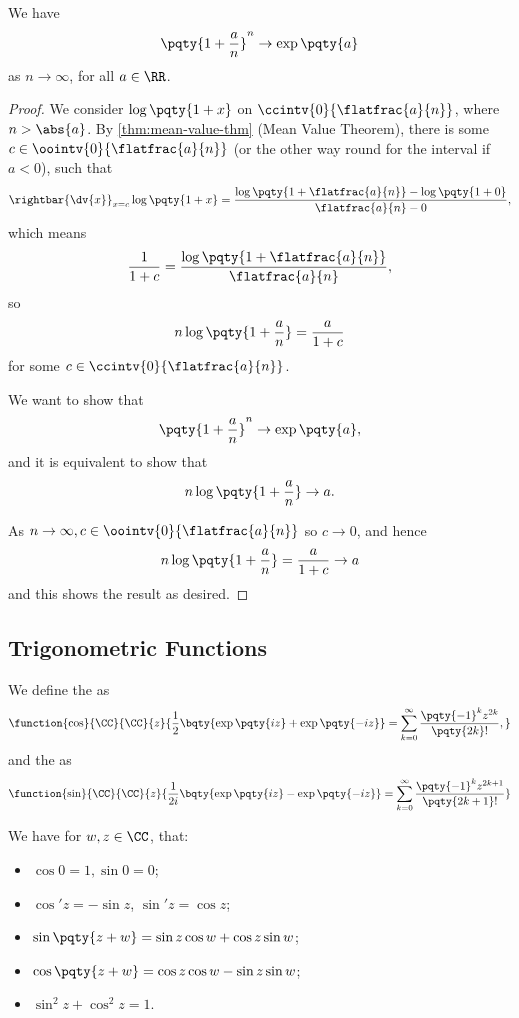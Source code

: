\begin{proposition}
    We have
    \[
        \pqty{1 + \frac{a}{n}}^n \to \exp \pqty{a}
    \]
    as \(n \to \infty\), for all \(a \in \RR\).
\end{proposition}

\begin{proof}
    We consider \(\log\pqty{1 + x}\) on \(\ccintv{0}{\flatfrac{a}{n}}\), where \(n > \abs{a}\). By \autoref{thm:mean-value-thm} (Mean Value Theorem), there is some \(c \in \oointv{0}{\flatfrac{a}{n}}\) (or the other way round for the interval if \(a < 0\)), such that
    \[
        \rightbar{\dv{x}}_{x = c} \log \pqty{1 + x} = \frac{\log\pqty{1 + \flatfrac{a}{n}} - \log\pqty{1 + 0}}{\flatfrac{a}{n} - 0},
    \]
    which means
    \[
        \frac{1}{1 + c} = \frac{\log \pqty{1 + \flatfrac{a}{n}}}{\flatfrac{a}{n}},
    \]
    so
    \[
        n \log \pqty{1 + \frac{a}{n}} = \frac{a}{1 + c}
    \]
    for some \(c \in \ccintv{0}{\flatfrac{a}{n}}\).

    We want to show that
    \[
        \pqty{1 + \frac{a}{n}}^n \to \exp\pqty{a},
    \]
    and it is equivalent to show that
    \[
        n \log\pqty{1 + \frac{a}{n}} \to a.
    \]

    As \(n \to \infty, c \in \oointv{0}{\flatfrac{a}{n}}\) so \(c \to 0\), and hence
    \[
        n \log\pqty{1 + \frac{a}{n}} = \frac{a}{1 + c} \to a
    \]
    and this shows the result as desired.
\end{proof}

\subsection{Trigonometric Functions}

\begin{definition}
    \label{def:trigonometric-functions}%
    We define the  as
    \[
        \function{\cos}{\CC}{\CC}{z}{\frac{1}{2} \bqty{\exp \pqty{iz} + \exp \pqty{- iz}} = \sum_{k = 0}^{\infty} \frac{\pqty{-1}^k z^{2k}}{\pqty{2k}!},}
    \]
    and the  as
    \[
        \function{\sin}{\CC}{\CC}{z}{\frac{1}{2i} \bqty{\exp \pqty{iz} - \exp \pqty{- iz}} = \sum_{k = 0}^{\infty} \frac{\pqty{-1}^k z^{2k + 1}}{\pqty{2k + 1}!}}
    \]
\end{definition}

\begin{lemma}
    \label{lem:properties-trigonometric-functions}%
    We have for \(w, z \in \CC\), that:
    \begin{itemize}
        \item \(\cos 0 = 1, \sin 0 = 0\);
        \item \(\cos' z = - \sin z\), \(\sin' z = \cos z\);
        \item \(\sin \pqty{z + w} = \sin z \cos w + \cos z \sin w\);
        \item \(\cos \pqty{z + w} = \cos z \cos w - \sin z \sin w\);
        \item \(\sin^2 z + \cos^2 z = 1\).
    \end{itemize}
\end{lemma}

